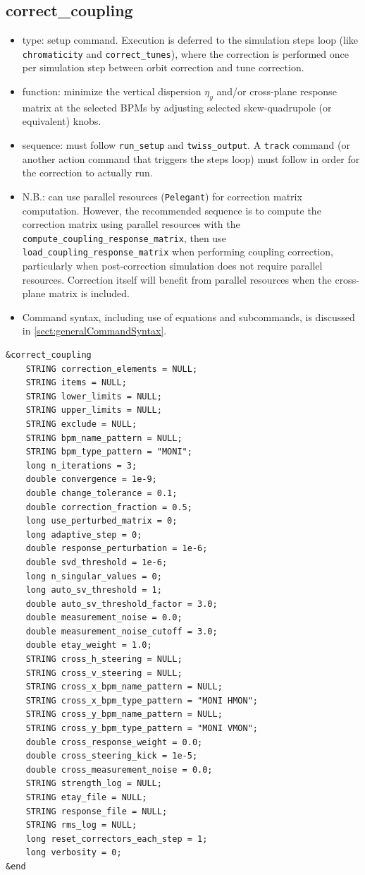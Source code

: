 \documentclass[11pt]{article}
\begin{document}
\subsection{correct\_coupling \label{subsec:correctcoupling}}

\begin{itemize}
\item type: setup command.  Execution is deferred to the simulation steps
  loop (like \verb|chromaticity| and \verb|correct_tunes|), where the
  correction is performed once per simulation step between orbit correction
  and tune correction.
\item function: minimize the vertical dispersion $\eta_y$ and/or cross-plane response matrix
  at the selected BPMs by adjusting selected skew-quadrupole (or equivalent) knobs.  
\item sequence: must follow \verb|run_setup| and \verb|twiss_output|.  A
  \verb|track| command (or another action command that triggers the steps
  loop) must follow in order for the correction to actually run.
\item N.B.: can use parallel resources (\verb|Pelegant|) for correction matrix computation.
  However, the recommended sequence is to compute the correction
  matrix using parallel resources with the \verb|compute_coupling_response_matrix|,
  then use \verb|load_coupling_response_matrix| when performing coupling
  correction, particularly when post-correction simulation does not require parallel resources.
  Correction itself will benefit from parallel resources when the cross-plane matrix is included.
\item Command syntax, including use of equations and subcommands, is discussed in \ref{sect:generalCommandSyntax}.
\end{itemize}

\begin{verbatim}
&correct_coupling
    STRING correction_elements = NULL;
    STRING items = NULL;
    STRING lower_limits = NULL;
    STRING upper_limits = NULL;
    STRING exclude = NULL;
    STRING bpm_name_pattern = NULL;
    STRING bpm_type_pattern = "MONI";
    long n_iterations = 3;
    double convergence = 1e-9;
    double change_tolerance = 0.1;
    double correction_fraction = 0.5;
    long use_perturbed_matrix = 0;
    long adaptive_step = 0;
    double response_perturbation = 1e-6;
    double svd_threshold = 1e-6;
    long n_singular_values = 0;
    long auto_sv_threshold = 1;
    double auto_sv_threshold_factor = 3.0;
    double measurement_noise = 0.0;
    double measurement_noise_cutoff = 3.0;
    double etay_weight = 1.0;
    STRING cross_h_steering = NULL;
    STRING cross_v_steering = NULL;
    STRING cross_x_bpm_name_pattern = NULL;
    STRING cross_x_bpm_type_pattern = "MONI HMON";
    STRING cross_y_bpm_name_pattern = NULL;
    STRING cross_y_bpm_type_pattern = "MONI VMON";
    double cross_response_weight = 0.0;
    double cross_steering_kick = 1e-5;
    double cross_measurement_noise = 0.0;
    STRING strength_log = NULL;
    STRING etay_file = NULL;
    STRING response_file = NULL;
    STRING rms_log = NULL;
    long reset_correctors_each_step = 1;
    long verbosity = 0;
&end
\end{verbatim}
\end{document}
